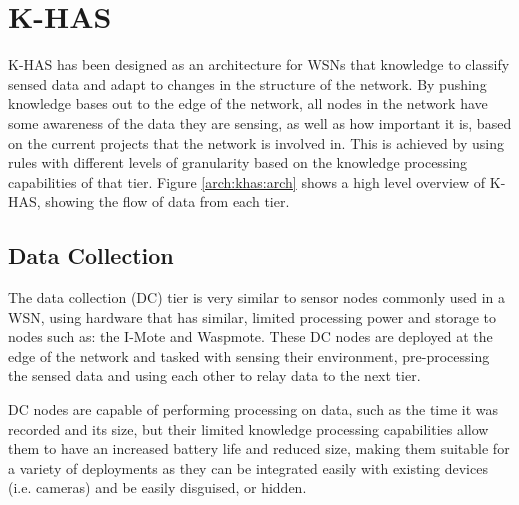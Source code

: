  



	\DIFaddend \section{K-HAS}\label{arch:khas}
		K-HAS has been designed as an architecture for WSNs that \DIFdelbegin {}\DIFdelend \DIFaddbegin {}\DIFaddend knowledge to classify sensed data and adapt to changes in the structure of the network. By pushing knowledge bases out to the edge of the network, all nodes in the network have some awareness of the data they are sensing, as well as how important it is, based on the current projects that the network is involved in. This is achieved by using rules with different levels of granularity based on the knowledge processing capabilities of that tier. Figure \ref{arch:khas:arch} shows a high level overview of K-HAS, showing the flow of data from each tier.

	
	\subsection{Data Collection}\label{khas:dc}
	The data collection (DC) tier is very similar to sensor nodes commonly used in a WSN, using hardware that has similar, limited processing power and storage to nodes such as: the I-Mote and Waspmote. These DC nodes are deployed at the edge of the network and tasked with sensing their environment, pre-processing the sensed data and using each other to relay data to the next tier.

	DC nodes are capable of performing processing on data, such as the time it was recorded and its size, but their limited knowledge processing capabilities allow them to have an increased battery life and reduced size, making them suitable for a variety of deployments as they can be integrated easily with existing devices (i.e. cameras) and be easily disguised, or hidden.

